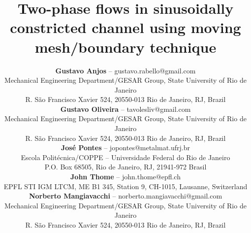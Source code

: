 \documentclass[12pt,fleqn]{article}
\begin{document}
	\title{Two-phase flows in sinusoidally constricted channel using
	       moving mesh/boundary technique}

	\author{\rm
		\scriptsize
		\begin{tabular}{l}
			\textbf{Gustavo Anjos} -- gustavo.rabello@gmail.com\\
			Mechanical Engineering Department/GESAR Group, State University of Rio de Janeiro\\
			R. S\~ao Francisco Xavier 524, 20550-013 Rio de Janeiro, RJ, Brazil\\
			\textbf{Gustavo Oliveira} -- tavolesliv@gmail.com\\
			Mechanical Engineering Department/GESAR Group, State University of Rio de Janeiro\\
			R. S\~ao Francisco Xavier 524, 20550-013 Rio de Janeiro, RJ, Brazil\\
			\textbf{Jos\'e Pontes} -- jopontes@metalmat.ufrj.br\\
			Escola Polit\'ecnica/COPPE -- Universidade Federal do Rio de Janeiro\\
			P.O. Box 68505, Rio de Janeiro, RJ, 21941-972 Brasil\\
			\textbf{John Thome} -- john.thome@epfl.ch\\
			EPFL STI IGM LTCM, ME B1 345, Station 9, CH-1015, Lausanne, Switzerland\\
			\textbf{Norberto Mangiavacchi} -- norberto.mangiavacchi@gmail.com\\
			Mechanical Engineering Department/GESAR Group, State University of Rio de Janeiro\\
			R. S\~ao Francisco Xavier 524, 20550-013 Rio de Janeiro, RJ, Brazil
		\end{tabular}
	}	
\end{document}
